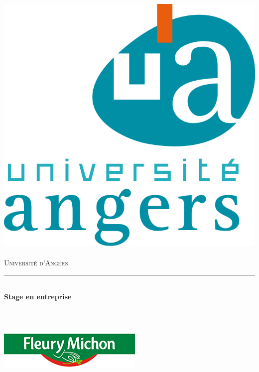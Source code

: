 \documentclass[a4paper,12pt]{extarticle}
\newcommand{\HRule}{\rule{\linewidth}{0.5mm}}
\begin{document}
	\begin{titlepage}
		\begin{sffamily}
		\begin{center}
		
		\includegraphics[scale=0.5]{Img/logo/logo_iutangers}~\\[1.5cm]
		
		\textsc{\LARGE Université d'Angers}\\[1.5cm]
		
		\HRule \\[0.4cm]
		{ \huge \bfseries Stage en entreprise}{\bfseries  \\[0.4cm]}
		\HRule \\[1.5cm]
		
		\begin{center}
			\includegraphics[scale=1]{Img/logo/logo_fleurymichon}
		\end{center}
		

\end{center}
\end{sffamily}
\end{titlepage}
\end{document}

